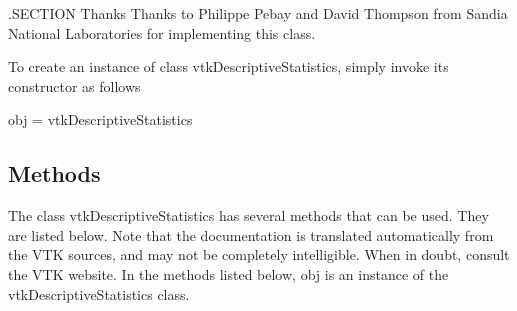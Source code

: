 .S\-E\-C\-T\-I\-O\-N Thanks Thanks to Philippe Pebay and David Thompson from Sandia National Laboratories for implementing this class.

To create an instance of class vtk\-Descriptive\-Statistics, simply invoke its constructor as follows \begin{DoxyVerb}  obj = vtkDescriptiveStatistics
\end{DoxyVerb}
 \hypertarget{vtkwidgets_vtkxyplotwidget_Methods}{}\subsection{Methods}\label{vtkwidgets_vtkxyplotwidget_Methods}
The class vtk\-Descriptive\-Statistics has several methods that can be used. They are listed below. Note that the documentation is translated automatically from the V\-T\-K sources, and may not be completely intelligible. When in doubt, consult the V\-T\-K website. In the methods listed below, {\ttfamily obj} is an instance of the vtk\-Descriptive\-Statistics class. 
